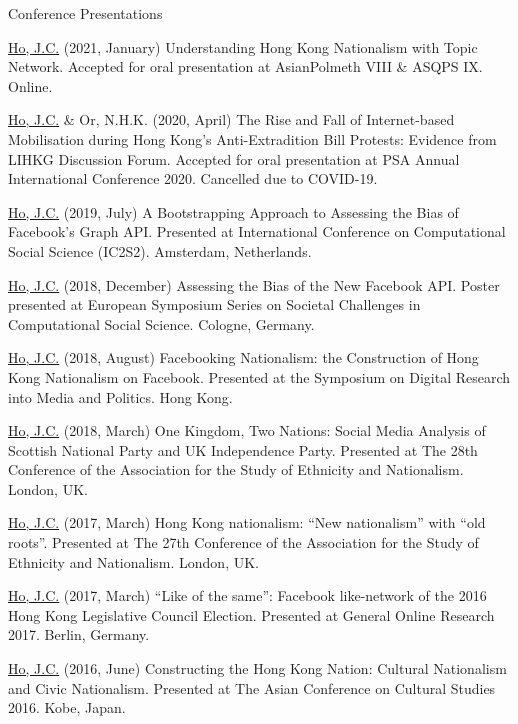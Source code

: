 \documentclass{resume} %
\begin{document}

\begin{rSection}{Conference Presentations}
\begin{rSubsectionConference}
\item \underline{Ho, J.C.} (2021, January) Understanding Hong Kong Nationalism with Topic Network. Accepted for oral presentation at AsianPolmeth VIII \& ASQPS IX. Online.
\item \underline{Ho, J.C.} \&  Or, N.H.K. (2020, April) The Rise and Fall of Internet-based Mobilisation during Hong Kong's Anti-Extradition Bill Protests: Evidence from LIHKG Discussion Forum. Accepted for oral presentation at PSA Annual International Conference 2020. Cancelled due to COVID-19.
\item \underline{Ho, J.C.} (2019, July) A Bootstrapping Approach to Assessing the Bias of Facebook’s Graph API. Presented at International Conference on Computational Social Science (IC2S2). Amsterdam, Netherlands.
\item \underline{Ho, J.C.} (2018, December) Assessing the Bias of the New Facebook API. Poster presented at European Symposium Series on Societal Challenges in Computational Social Science. Cologne, Germany.
\item \underline{Ho, J.C.} (2018, August) Facebooking Nationalism: the Construction of Hong Kong Nationalism on Facebook. Presented at the Symposium on Digital Research into Media and Politics. Hong Kong.
\item \underline{Ho, J.C.} (2018, March) One Kingdom, Two Nations: Social Media Analysis of Scottish National Party and UK Independence Party. Presented at The 28th Conference of the Association for the Study of Ethnicity and Nationalism. London, UK.
\item \underline{Ho, J.C.} (2017, March) Hong Kong nationalism: ``New nationalism'' with ``old roots''. Presented at The 27th Conference of the Association for the Study of Ethnicity and Nationalism. London, UK.
\item \underline{Ho, J.C.} (2017, March) ``Like of the same'': Facebook like-network of the 2016 Hong Kong Legislative Council Election. Presented at General Online Research 2017. Berlin, Germany.
\item \underline{Ho, J.C.} (2016, June) Constructing the Hong Kong Nation: Cultural Nationalism and Civic Nationalism. Presented at The Asian Conference on Cultural Studies 2016. Kobe, Japan.
\end{rSubsectionConference}
\end{rSection}
\end{document}
